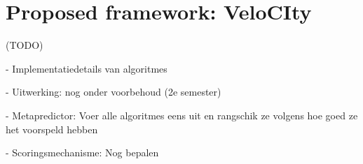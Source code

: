 \chapter{Proposed framework: VeloCIty}
(TODO)

- Implementatiedetails van algoritmes

- Uitwerking: nog onder voorbehoud (2e semester)

- Metapredictor: Voer alle algoritmes eens uit en rangschik ze volgens hoe goed ze het voorspeld hebben

- Scoringsmechanisme: Nog bepalen
